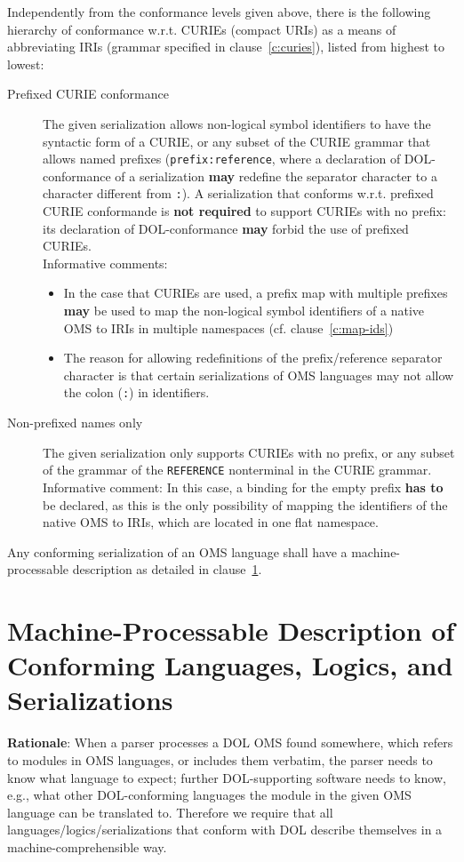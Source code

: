 \documentclass[10pt,fleqn,%
\ifpretendfinal
final%
\else
draft%
\fi,
]{scrreprt}
\makeatletter
\newcommand*{\cf}{cf.\@\xspace}
\newcommand*{\wrt}{w.r.t.\@\xspace}
\newcommand*{\syntax}[1]{\texttt{#1}}
\newcommand*{\notrequired}{\textbf{not required}\xspace}
\newcommand*{\may}{\textbf{may}\xspace}
\newcommand*{\hasto}{\textbf{has to}\xspace}
\newcommand{\clauserefname}{clause}
\newcommand{\cref}[1]{\clauserefname~\ref{#1}}
\newcommand{\sclause}[1]{\section{#1}}
\makeatother
\begin{document}
Independently from the conformance levels given above, there is the following hierarchy of conformance \wrt CURIEs (compact URIs) as a means of abbreviating IRIs (grammar specified in \cref{c:curies}), listed from highest to lowest:
\begin{description}
\item[Prefixed CURIE conformance] The given serialization allows non-logical symbol identifiers to have the syntactic form of a CURIE, or any subset of the CURIE grammar that allows named prefixes (\syntax{prefix:reference}, where a declaration of DOL-conformance of a serialization \may redefine the separator character to a character different from \syntax{:}).  A serialization that conforms \wrt prefixed CURIE conformande is \notrequired to support CURIEs with no prefix: its declaration of DOL-conformance \may forbid the use of prefixed CURIEs.\\
  Informative comments:
  \begin{itemize}
  \item In the case that CURIEs are used, a prefix map with multiple prefixes \may be used to map the non-logical symbol identifiers of a native OMS to IRIs in multiple namespaces (\cf \cref{c:map-ids})
  \item The reason for allowing redefinitions of the prefix/reference separator character is that certain serializations of OMS languages may not allow the colon (\syntax{:}) in identifiers.
  \end{itemize}
\item[Non-prefixed names only] The given serialization only supports CURIEs with no prefix, or any subset of the grammar of the \syntax{REFERENCE} nonterminal in the CURIE grammar.\\
  Informative comment: In this case, a binding for the empty prefix \hasto be declared, as this is the only possibility of mapping the identifiers of the native OMS to IRIs, which are located in one flat namespace.
\end{description}

Any conforming serialization of an OMS language shall have a machine-processable description as detailed in \cref{c:conform:description}.

\sclause{Machine-Processable Description of Conforming Languages, Logics, and Serializations}\label{c:conform:description}

\begin{fminipage}{\textwidth}
\textbf{Rationale}: When a parser processes a DOL OMS found somewhere, which refers to modules in OMS languages, or includes them verbatim, the parser needs to know what language to expect; further DOL-supporting software needs to know, e.g., what other DOL-conforming languages the module in the given OMS language can be translated to.  Therefore we require that all languages/logics/serializations that conform with DOL describe themselves in a machine-comprehensible way.
\end{fminipage}
\end{document}
